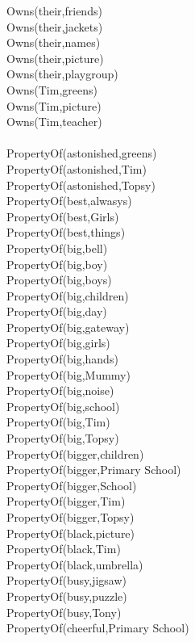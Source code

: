 \begin{multicols}{2}
\begin{footnotesize}
Owns(their,friends) \\
Owns(their,jackets) \\
Owns(their,names) \\
Owns(their,picture) \\
Owns(their,playgroup) \\
Owns(Tim,greens) \\
Owns(Tim,picture) \\
Owns(Tim,teacher) \\
~\\
PropertyOf(astonished,greens) \\
PropertyOf(astonished,Tim) \\
PropertyOf(astonished,Topsy) \\
PropertyOf(best,alwasys) \\
PropertyOf(best,Girls) \\
PropertyOf(best,things) \\
PropertyOf(big,bell) \\
PropertyOf(big,boy) \\
PropertyOf(big,boys) \\
PropertyOf(big,children) \\
PropertyOf(big,day) \\
PropertyOf(big,gateway) \\
PropertyOf(big,girls) \\
PropertyOf(big,hands) \\
PropertyOf(big,Mummy) \\
PropertyOf(big,noise) \\
PropertyOf(big,school) \\
PropertyOf(big,Tim) \\
PropertyOf(big,Topsy) \\
PropertyOf(bigger,children) \\
PropertyOf(bigger,Primary School) \\
PropertyOf(bigger,School) \\
PropertyOf(bigger,Tim) \\
PropertyOf(bigger,Topsy) \\
PropertyOf(black,picture) \\
PropertyOf(black,Tim) \\
PropertyOf(black,umbrella) \\
PropertyOf(busy,jigsaw) \\
PropertyOf(busy,puzzle) \\
PropertyOf(busy,Tony) \\
PropertyOf(cheerful,Primary School) \\

\end{footnotesize}
\end{multicols}
